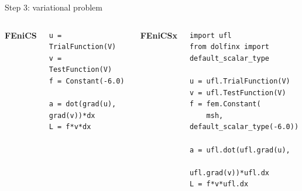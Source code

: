 \documentclass[aspectratio=169, 11pt]{beamer}
\begin{document}
\begin{frame}[fragile]{Step 3: variational problem}

\begin{columns}[T]
\textbf{FEniCS}
\begin{lstlisting}[basicstyle=\ttfamily\tiny]
u = TrialFunction(V)
v = TestFunction(V)
f = Constant(-6.0)

a = dot(grad(u), grad(v))*dx
L = f*v*dx
\end{lstlisting}

\textbf{FEniCSx}
\begin{lstlisting}[basicstyle=\ttfamily\tiny]
import ufl
from dolfinx import default_scalar_type

u = ufl.TrialFunction(V)
v = ufl.TestFunction(V)
f = fem.Constant(
    msh, default_scalar_type(-6.0))

a = ufl.dot(ufl.grad(u),
            ufl.grad(v))*ufl.dx
L = f*v*ufl.dx
\end{lstlisting}
\end{columns}

\end{frame}
\end{document}
